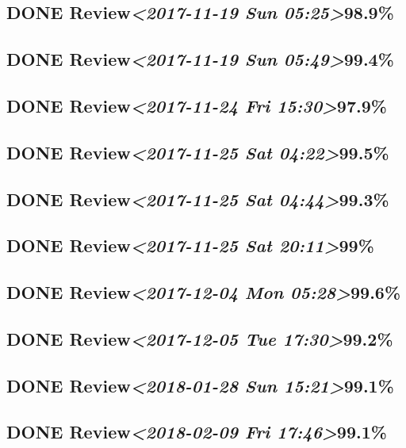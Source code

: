 \documentclass[11pt]{ctexart}
\begin{document}
\subsection{{\bfseries\sffamily DONE} Review\textit{<2017-11-19 Sun 05:25>}98.9\%}
\label{sec:org624d9c4}
\subsection{{\bfseries\sffamily DONE} Review\textit{<2017-11-19 Sun 05:49>}99.4\%}
\label{sec:orga9d78e3}
\subsection{{\bfseries\sffamily DONE} Review\textit{<2017-11-24 Fri 15:30>}97.9\%}
\label{sec:org482ae08}
\subsection{{\bfseries\sffamily DONE} Review\textit{<2017-11-25 Sat 04:22>}99.5\%}
\label{sec:org4fc8637}
\subsection{{\bfseries\sffamily DONE} Review\textit{<2017-11-25 Sat 04:44>}99.3\%}
\label{sec:org0704c9b}
\subsection{{\bfseries\sffamily DONE} Review\textit{<2017-11-25 Sat 20:11>}99\%}
\label{sec:org5936947}
\subsection{{\bfseries\sffamily DONE} Review\textit{<2017-12-04 Mon 05:28>}99.6\%}
\label{sec:org33cc774}
\subsection{{\bfseries\sffamily DONE} Review\textit{<2017-12-05 Tue 17:30>}99.2\%}
\label{sec:org532ead8}
\subsection{{\bfseries\sffamily DONE} Review\textit{<2018-01-28 Sun 15:21>}99.1\%}
\label{sec:org5a09343}
\subsection{{\bfseries\sffamily DONE} Review\textit{<2018-02-09 Fri 17:46>}99.1\%}
\label{sec:org95d6efe}
\end{document}
